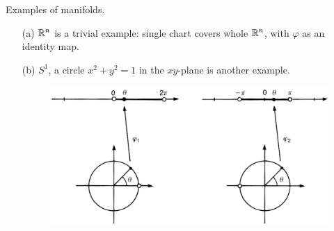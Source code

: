 \documentclass[a4paper, 10pt]{article}
\begin{document}
\begin{example}
    Examples of manifolds.
    \begin{itemize}
        \item[(a)] $\mathbb{R}^{n}$ is a trivial example: single chart covers whole $\mathbb{R}^{n}$, with $\varphi$ as an identity map.
        \item[(b)] $S^{1}$, a circle $x^{2} + y^{2} = 1$ in the $xy$-plane is another example.
        
        \begin{figure}[htbp]
            \centering
            \includegraphics[width=0.8\linewidth]{../images/lecture05/5_02.png}
        \end{figure}
        

\end{itemize}
\end{example}
\end{document}
